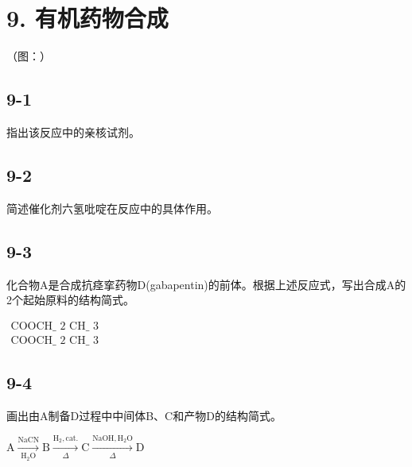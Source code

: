 \section*{9. 有机药物合成}
（图：）

\subsection*{9-1}
指出该反应中的亲核试剂。

\subsection*{9-2}
简述催化剂六氢吡啶在反应中的具体作⽤。

\subsection*{9-3}
化合物A是合成抗痉挛药物D(gabapentin)的前体。根据上述反应式，写出合成A的2个起始原料的结构简式。

$
\begin{array}{c} \text {COOCH_ {2} CH_ {3}} \\ \text {COOCH_ {2} CH_ {3}} \end{array}
$

\subsection*{9-4}
画出由A制备D过程中中间体B、C和产物D的结构简式。

$
\mathrm{A} \xrightarrow [ \mathrm{H} _ {2} \mathrm{O} ]{\mathrm{NaCN}} \mathrm{B} \xrightarrow [ \Delta ]{\mathrm{H} _ {2} , \text {cat.}} \mathrm{C} \xrightarrow [ \Delta ]{\mathrm{NaOH} , \mathrm{H} _ {2} \mathrm{O}} \mathrm{D}
$
